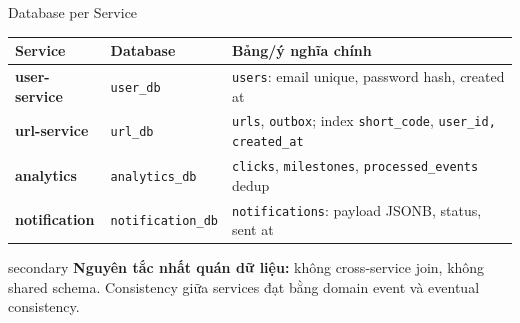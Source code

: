\documentclass[aspectratio=169]{beamer}
\begin{document}
\begin{frame}{Database per Service}
    \scriptsize
    \begin{center}
    \begin{tabular}{>{\bfseries}p{}p{}p{}}
        \toprule
        Service & Database & Bảng/ý nghĩa chính \\
        \midrule
        user-service & \texttt{user\_db} & \texttt{users}: email unique, password hash, created at \\
        url-service & \texttt{url\_db} & \texttt{urls}, \texttt{outbox}; index \texttt{short\_code}, \texttt{user\_id, created\_at} \\
        analytics & \texttt{analytics\_db} & \texttt{clicks}, \texttt{milestones}, \texttt{processed\_events} dedup \\
        notification & \texttt{notification\_db} & \texttt{notifications}: payload JSONB, status, sent at \\
        \bottomrule
    \end{tabular}
    \end{center}
    \vspace{0.3cm}
    \begin{claimbox}{secondary}
        \small \textbf{Nguyên tắc nhất quán dữ liệu:} không cross-service join, không shared schema. Consistency giữa services đạt bằng domain event và eventual consistency.
    \end{claimbox}
\end{frame}
\end{document}

